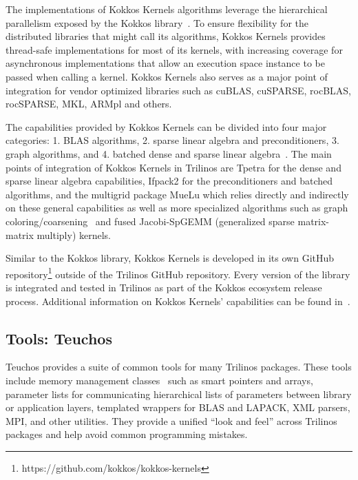 The implementations of Kokkos Kernels algorithms leverage the hierarchical parallelism exposed by the Kokkos library~\cite{kim2017designing}. To ensure flexibility for the distributed libraries that might call its algorithms, Kokkos Kernels provides thread-safe implementations for most of its kernels, with increasing coverage for asynchronous implementations that allow an execution space instance to be passed when calling a kernel. Kokkos Kernels also serves as a major point of integration for vendor optimized libraries such as cuBLAS, cuSPARSE, rocBLAS, rocSPARSE, MKL, ARMpl and others.

The capabilities provided by Kokkos Kernels can be divided into four major categories:
1. BLAS algorithms, 2. sparse linear algebra and preconditioners, 3. graph algorithms, and
4. batched dense and sparse linear algebra~\cite{liegeois2023performance}. The main
points of integration of Kokkos Kernels in Trilinos are Tpetra for the dense and sparse
linear algebra capabilities, Ifpack2 for the preconditioners and batched algorithms,
and the multigrid package MueLu which relies directly and indirectly on these general capabilities as well as more specialized algorithms such as graph coloring/coarsening~\cite{kelley2022parallel} and fused Jacobi-SpGEMM (generalized sparse matrix-matrix multiply) kernels.

Similar to the Kokkos library, Kokkos Kernels is developed in its own GitHub
repository\footnote{https://github.com/kokkos/kokkos-kernels} outside of the Trilinos
GitHub repository. Every version of the library is integrated and tested in Trilinos
as part of the Kokkos ecosystem release process. Additional information on Kokkos
Kernels' capabilities can be found in~\cite{deveci2018multithreaded,wolf2017fast}.



\subsection{Tools: Teuchos}

Teuchos provides a suite of common tools for many Trilinos packages. These tools include memory management classes~\cite{bartlett2010} such as smart pointers and arrays, parameter lists for communicating hierarchical lists of parameters between library or application layers, templated wrappers for BLAS and LAPACK, XML parsers, MPI, and other utilities. They provide a unified ``look and feel'' across Trilinos packages and help avoid common programming mistakes.



